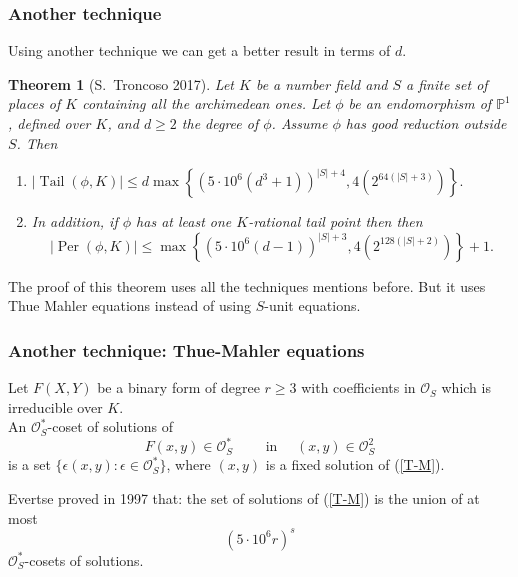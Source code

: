 \documentclass{beamer}
\def\jump{ \quad \\ \vspace{0.7cm} \pause}
\def\PP{{\mathbb P}}
\DeclareMathOperator{\Tail}{Tail}
\DeclareMathOperator{\Per}{Per}
\theoremstyle{thmstyle}
\theoremstyle{thmstyle}
\newtheorem*{mythm}{Theorem}
\theoremstyle{mystyle}
\theoremstyle{qstnstyle}
\begin{document}
\begin{frame}
\frametitle{Another technique}

Using another technique we can get a better result in terms of $d$. \pause

\begin{mythm}[S.\ Troncoso 2017]
Let $K$ be a number field and $S$ a finite set of places of $K$ containing all the archimedean ones. Let $\phi $ be an endomorphism of $\PP^1$, defined over $K$, and $d \geq 2$ the degree of $\phi$. Assume $\phi$ has  good reduction outside $S$. Then

\begin{enumerate}

\item [(a)] $|\Tail(\phi,K) | \leq d\max\left\{  (5 \cdot 10^6 (d^3+1))^{|S|+4} ,4(2^{64(|S|+3)}) \right \}.$\jump

\item [(b)] In addition, if $\phi$ has at least one $K$-rational tail point then then
$$|\Per(\phi,K)| \leq   \max \left\{  (5 \cdot 10^6 (d-1))^{|S|+3} ,4(2^{128(|S|+2)}) \right\}+1.$$
\end{enumerate}
\end{mythm}

\pause


The proof of this theorem uses all the techniques mentions before. But it uses Thue Mahler equations instead of using $S$-unit equations.
\end{frame}




\begin{frame}
\frametitle{Another technique: Thue-Mahler equations}
Let $F(X,Y)$ be a binary  form of degree $r \geq 3$ with coefficients in $\mathcal{O}_S$  which is irreducible over $K$.\jump  An $\mathcal{O}_S^{*}$-coset of solutions of
\begin{equation} \label{T-M}
 F(x,y) \in \mathcal{O}_S^{*}  \quad\quad \mbox{ in } \quad (x,y) \in \mathcal{O}_S^{2}
\end{equation}
is a set $\{\epsilon(x,y): \epsilon \in \mathcal{O}_S^{*} \}$, where $(x,y)$ is a fixed solution of (\ref{T-M}).
\jump

Evertse proved in 1997 that: the set of solutions of (\ref{T-M}) is the union of at most
$$ (5\cdot 10^6r)^s$$
$\mathcal{O}_S^{*}$-cosets of solutions.
\end{frame}
\end{document}
